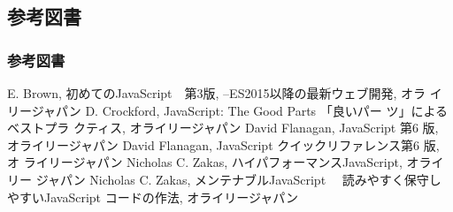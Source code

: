 \subsection{参考図書}
\begin{frame}
 \frametitle{参考図書}
\begin{thebibliography}{9}
  E. Brown, 初めてのJavaScript　第3版, --ES2015以降の最新ウェブ開発, オラ
       イリージャパン\label{ES2016}
 D. Crockford, JavaScript: The Good Parts 「良いパー
	 ツ」によるベストプラ クティス, オライリージャパン
 David Flanagan, JavaScript 第6 版, オライリージャパン
 David Flanagan, JavaScript クイックリファレンス第6 版, オ
	 ライリージャパン
 Nicholas C. Zakas, ハイパフォーマンスJavaScript, オライリー
	 ジャパン
 Nicholas C. Zakas, メンテナブルJavaScript 　読みやすく保守しやすいJavaScript 
コードの作法, オライリージャパン
\end{thebibliography}
\end{frame}
